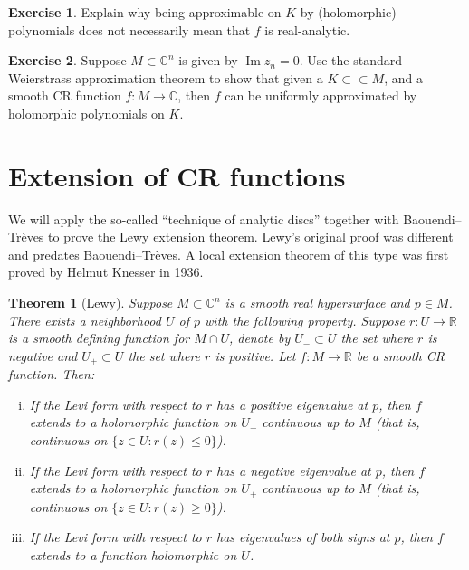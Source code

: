 \documentclass[12pt,openany]{book}
\renewcommand{\Im}{\operatorname{Im}}
\newcommand{\C}{{\mathbb{C}}}
\newcommand{\R}{{\mathbb{R}}}
\theoremstyle{plain}
\newtheorem{thm}{Theorem}[section]
\theoremstyle{remark}
\theoremstyle{definition}
\newenvironment{exbox}{%
    \def\FrameCommand{\vrule width 1pt \relax\hspace{10pt}}%
    \MakeFramed{\advance\hsize-\width\FrameRestore}%
}{%
    \endMakeFramed
}
\theoremstyle{exercise}
\newtheorem{exercise}{Exercise}[section]
\theoremstyle{example}
\begin{document}
\begin{exbox}
\begin{exercise}
Explain why being approximable on $K$ by (holomorphic) polynomials does not
necessarily mean that
$f$ is real-analytic.
\end{exercise}

\begin{exercise}
Suppose $M \subset \C^n$ is given by $\Im z_n = 0$.  Use the standard
Weierstrass approximation theorem to show that given a $K \subset \subset M$,
and a smooth CR function $f \colon M \to \C$, then $f$ can be uniformly approximated
by holomorphic polynomials on $K$.
\end{exercise}
\end{exbox}


\section{Extension of CR functions}

We will apply the so-called ``technique of analytic discs'' together
with
Baouendi--Tr{\`e}ves to prove the
Lewy extension theorem.  Lewy's original proof was different
and predates Baouendi--Tr{\`e}ves.  A local extension theorem of this type
was first proved by Helmut Knesser in 1936.

\begin{thm}[Lewy]%
Suppose $M \subset \C^n$ is a smooth real hypersurface and $p \in M$.
There exists a neighborhood $U$ of $p$ with the following
property.
Suppose $r \colon U \to \R$ is
a smooth defining function for $M \cap U$, denote by $U_- \subset U$ the set where $r$
is negative and $U_+ \subset U$ the set where $r$ is positive.
Let $f \colon M \to \R$ be a smooth CR function.
Then:

\begin{enumerate}[(i)]
\item
If the Levi form with respect to $r$ has a positive eigenvalue at $p$, then
$f$ extends to a holomorphic function on $U_-$ continuous up to $M$
(that is, continuous on $\{ z \in U : r(z) \leq 0 \}$).
\item
If the Levi form with respect to $r$ has a negative eigenvalue at $p$, then
$f$ extends to a holomorphic function on $U_+$ continuous up to $M$
(that is, continuous on $\{ z \in U : r(z) \geq 0 \}$).
\item
If the Levi form with respect to $r$ has eigenvalues of both signs at $p$, then
$f$ extends to a function holomorphic on $U$.
\end{enumerate}
\end{thm}
\end{document}
